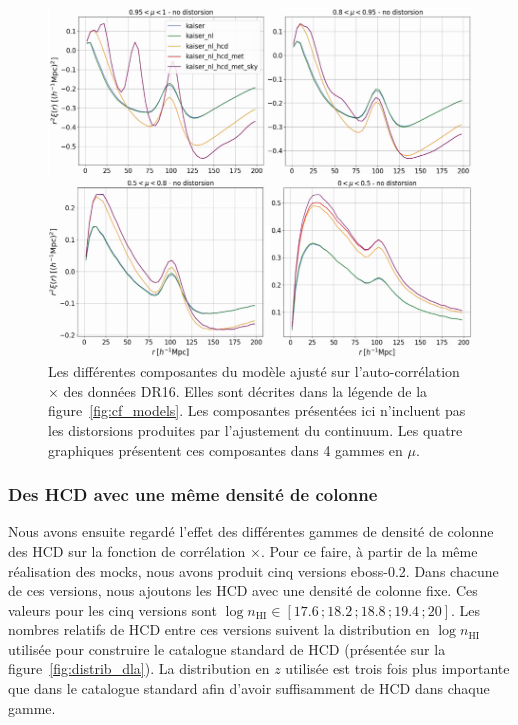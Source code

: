 \begin{figure}
  \centering
  \includegraphics[scale=0.5]{cf_models_no_dist}
  \caption{Les différentes composantes du modèle ajusté sur l'auto-corrélation \lya{}$\times$\lya{} des données DR16. Elles sont décrites dans la légende de la figure~\ref{fig:cf_models}.
    Les composantes présentées ici n'incluent pas les distorsions produites par l'ajustement du continuum.
    Les quatre graphiques présentent ces composantes dans 4 gammes en $\mu$.}
  \label{fig:cf_models_no_dist}
\end{figure}



\subsubsection{Des HCD avec une même densité de colonne}
Nous avons ensuite regardé l'effet des différentes gammes de densité de colonne des HCD sur la fonction de corrélation \lya{}$\times$\lya{}.
Pour ce faire, à partir de la même réalisation des mocks, nous avons produit cinq versions eboss-0.2. Dans chacune de ces versions, nous ajoutons les HCD avec une densité de colonne fixe. Ces valeurs pour les cinq versions sont $\log n_{\mathrm{HI}} \in [\num{17.6}\,;\num{18.2}\,;\num{18.8}\,;\num{19.4}\,;\num{20}]$. Les nombres relatifs de HCD entre ces versions suivent la distribution en $\log n_{\mathrm{HI}}$ utilisée pour construire le catalogue standard de HCD (présentée sur la figure~\ref{fig:distrib_dla}). La distribution en $z$ utilisée est trois fois plus importante que dans le catalogue standard afin d'avoir suffisamment de HCD dans chaque gamme.

